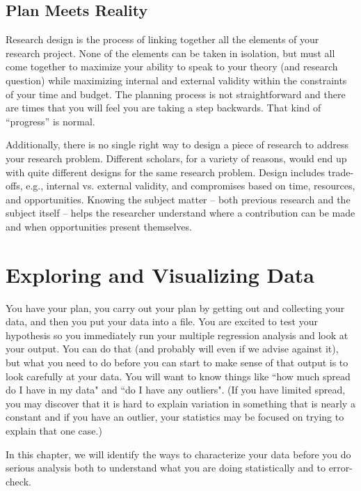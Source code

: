 \documentclass[11pt,openany]{book}\usepackage[]{graphicx}\usepackage[]{color}
\begin{document}
\section{Plan Meets Reality}

Research design is the process of linking together all the elements of your research project. None of the elements can be taken in isolation, but must all come together to maximize your ability to speak to your theory (and research question) while maximizing internal and external validity within the constraints of your time and budget. The planning process is not straightforward and there are times that you will feel you are taking a step backwards. That kind of ``progress'' is normal. 
	
Additionally, there is no single right way to design a piece of research to address your research problem. Different scholars, for a variety of reasons, would end up with quite different designs for the same research problem. Design includes trade-offs, e.g., internal vs. external validity, and compromises based on time, resources, and opportunities. Knowing the subject matter -- both previous research and the subject itself -- helps the researcher understand where a contribution can be made and when opportunities present themselves.




\chapter{Exploring and Visualizing Data}



You have your plan, you carry out your plan by getting out and collecting your data, and then you put your data into a file.  You are excited to test your hypothesis so you immediately run your multiple regression analysis and look at your output.  You can do that (and probably will even if we advise against it), but what you need to do before you can start to make sense of that output is to look carefully at your data.  You will want to know things like ``how much spread do I have in my data" and ``do I have any outliers".  (If you have limited spread, you may discover that it is hard to explain variation in something that is nearly a constant and if you have an outlier, your statistics may be focused on trying to explain that one case.) 

In this chapter, we will identify the ways to characterize your data before you do serious analysis both to understand what you are doing statistically and to error-check.
\end{document}
